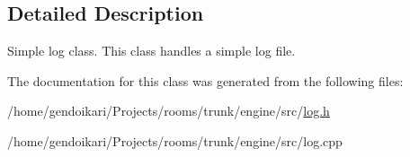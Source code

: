 \subsection{Detailed Description}
Simple log class. This class handles a simple log file. 

The documentation for this class was generated from the following files:\begin{DoxyCompactItemize}
\item 
/home/gendoikari/Projects/rooms/trunk/engine/src/\hyperlink{log_8h}{log.h}\item 
/home/gendoikari/Projects/rooms/trunk/engine/src/log.cpp\end{DoxyCompactItemize}
